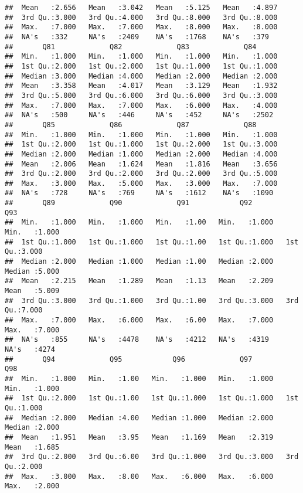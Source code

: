 \documentclass[
]{article}
\begin{document}
\begin{verbatim}
##  Mean   :2.656   Mean   :3.042   Mean   :5.125   Mean   :4.897  
##  3rd Qu.:3.000   3rd Qu.:4.000   3rd Qu.:8.000   3rd Qu.:8.000  
##  Max.   :7.000   Max.   :7.000   Max.   :8.000   Max.   :8.000  
##  NA's   :332     NA's   :2409    NA's   :1768    NA's   :379    
##       Q81             Q82             Q83             Q84       
##  Min.   :1.000   Min.   :1.000   Min.   :1.000   Min.   :1.000  
##  1st Qu.:2.000   1st Qu.:2.000   1st Qu.:1.000   1st Qu.:1.000  
##  Median :3.000   Median :4.000   Median :2.000   Median :2.000  
##  Mean   :3.358   Mean   :4.017   Mean   :3.129   Mean   :1.932  
##  3rd Qu.:5.000   3rd Qu.:6.000   3rd Qu.:6.000   3rd Qu.:3.000  
##  Max.   :7.000   Max.   :7.000   Max.   :6.000   Max.   :4.000  
##  NA's   :500     NA's   :446     NA's   :452     NA's   :2502   
##       Q85             Q86             Q87             Q88       
##  Min.   :1.000   Min.   :1.000   Min.   :1.000   Min.   :1.000  
##  1st Qu.:2.000   1st Qu.:1.000   1st Qu.:2.000   1st Qu.:3.000  
##  Median :2.000   Median :1.000   Median :2.000   Median :4.000  
##  Mean   :2.006   Mean   :1.624   Mean   :1.816   Mean   :3.656  
##  3rd Qu.:2.000   3rd Qu.:2.000   3rd Qu.:2.000   3rd Qu.:5.000  
##  Max.   :3.000   Max.   :5.000   Max.   :3.000   Max.   :7.000  
##  NA's   :728     NA's   :769     NA's   :1612    NA's   :1090   
##       Q89             Q90             Q91            Q92             Q93       
##  Min.   :1.000   Min.   :1.000   Min.   :1.00   Min.   :1.000   Min.   :1.000  
##  1st Qu.:1.000   1st Qu.:1.000   1st Qu.:1.00   1st Qu.:1.000   1st Qu.:3.000  
##  Median :2.000   Median :1.000   Median :1.00   Median :2.000   Median :5.000  
##  Mean   :2.215   Mean   :1.289   Mean   :1.13   Mean   :2.209   Mean   :5.009  
##  3rd Qu.:3.000   3rd Qu.:1.000   3rd Qu.:1.00   3rd Qu.:3.000   3rd Qu.:7.000  
##  Max.   :7.000   Max.   :6.000   Max.   :6.00   Max.   :7.000   Max.   :7.000  
##  NA's   :855     NA's   :4478    NA's   :4212   NA's   :4319    NA's   :4274   
##       Q94             Q95            Q96             Q97             Q98       
##  Min.   :1.000   Min.   :1.00   Min.   :1.000   Min.   :1.000   Min.   :1.000  
##  1st Qu.:2.000   1st Qu.:1.00   1st Qu.:1.000   1st Qu.:1.000   1st Qu.:1.000  
##  Median :2.000   Median :4.00   Median :1.000   Median :2.000   Median :2.000  
##  Mean   :1.951   Mean   :3.95   Mean   :1.169   Mean   :2.319   Mean   :1.685  
##  3rd Qu.:2.000   3rd Qu.:6.00   3rd Qu.:1.000   3rd Qu.:3.000   3rd Qu.:2.000  
##  Max.   :3.000   Max.   :8.00   Max.   :6.000   Max.   :6.000   Max.   :2.000  

\end{verbatim}
\end{document}
